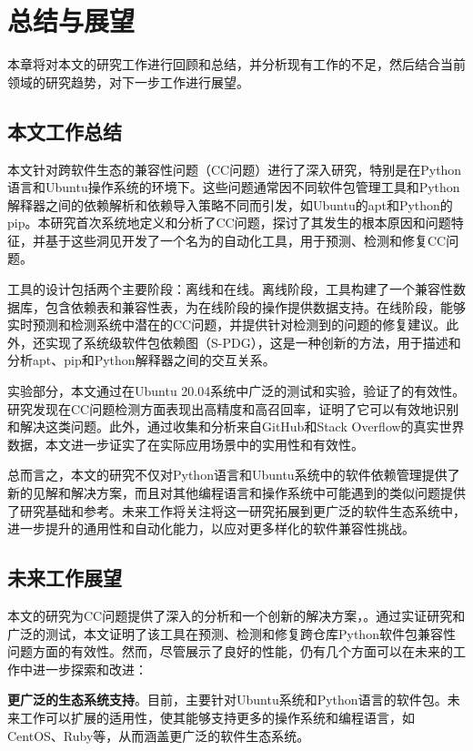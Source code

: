 \chapter{总结与展望}
本章将对本文的研究工作进行回顾和总结，并分析现有工作的不足，然后结合当前领域的研究趋势，对下一步工作进行展望。
\section{本文工作总结}
本文针对跨软件生态的兼容性问题（CC问题）进行了深入研究，特别是在Python语言和Ubuntu操作系统的环境下。这些问题通常因不同软件包管理工具和Python解释器之间的依赖解析和依赖导入策略不同而引发，如Ubuntu的apt和Python的pip。本研究首次系统地定义和分析了CC问题，探讨了其发生的根本原因和问题特征，并基于这些洞见开发了一个名为\tool{}的自动化工具，用于预测、检测和修复CC问题。

\tool{}工具的设计包括两个主要阶段：离线和在线。离线阶段，工具构建了一个兼容性数据库，包含依赖表和兼容性表，为在线阶段的操作提供数据支持。在线阶段，\tool{}能够实时预测和检测系统中潜在的CC问题，并提供针对检测到的问题的修复建议。此外，\tool{}还实现了系统级软件包依赖图（S-PDG），这是一种创新的方法，用于描述和分析apt、pip和Python解释器之间的交互关系。

实验部分，本文通过在Ubuntu 20.04系统中广泛的测试和实验，验证了\tool{}的有效性。研究发现\tool{}在CC问题检测方面表现出高精度和高召回率，证明了它可以有效地识别和解决这类问题。此外，通过收集和分析来自GitHub和Stack Overflow的真实世界数据，本文进一步证实了\tool{}在实际应用场景中的实用性和有效性。

总而言之，本文的研究不仅对Python语言和Ubuntu系统中的软件依赖管理提供了新的见解和解决方案，而且对其他编程语言和操作系统中可能遇到的类似问题提供了研究基础和参考。未来工作将关注将这一研究拓展到更广泛的软件生态系统中，进一步提升\tool{}的通用性和自动化能力，以应对更多样化的软件兼容性挑战。
\section{未来工作展望}
本文的研究为CC问题提供了深入的分析和一个创新的解决方案，\tool{}。通过实证研究和广泛的测试，本文证明了该工具在预测、检测和修复跨仓库Python软件包兼容性问题方面的有效性。然而，尽管\tool{}展示了良好的性能，仍有几个方面可以在未来的工作中进一步探索和改进：

\textbf{更广泛的生态系统支持}。目前，\tool{}主要针对Ubuntu系统和Python语言的软件包。未来工作可以扩展\tool{}的适用性，使其能够支持更多的操作系统和编程语言，如CentOS、Ruby等，从而涵盖更广泛的软件生态系统。

